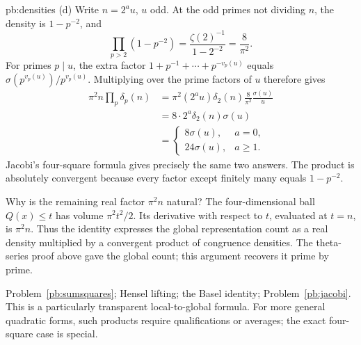 \begin{solution}{pb:densities}
(d) Write $n=2^au$, $u$ odd. At the odd primes not dividing $n$, the density is $1-p^{-2}$, and
\[
\prod_{p>2}(1-p^{-2})
=\frac{\zeta(2)^{-1}}{1-2^{-2}}
=\frac8{\pi^2}.
\]
For primes $p\mid u$, the extra factor
$1+p^{-1}+\cdots+p^{-v_p(u)}$ equals
$\sigma(p^{v_p(u)})/p^{v_p(u)}$. Multiplying over the prime factors of $u$ therefore gives
\[
\begin{aligned}
\pi^2 n\prod_p\delta_p(n)
&=\pi^2(2^au)\delta_2(n)
   \frac8{\pi^2}\frac{\sigma(u)}u\\
&=8\cdot2^a\delta_2(n)\sigma(u)\\
&=\begin{cases}
8\sigma(u),&a=0,\\
24\sigma(u),&a\ge1.
\end{cases}
\end{aligned}
\]
Jacobi's four-square formula gives precisely the same two answers. The product is absolutely convergent because every factor except finitely many equals $1-p^{-2}$.

Why is the remaining real factor $\pi^2n$ natural? The four-dimensional ball $Q(x)\le t$ has volume $\pi^2t^2/2$. Its derivative with respect to $t$, evaluated at $t=n$, is $\pi^2n$. Thus the identity expresses the global representation count as a real density multiplied by a convergent product of congruence densities. The theta-series proof above gave the global count; this argument recovers it prime by prime.

\tools Problem~\ref{pb:sumsquares}; Hensel lifting; the Basel identity; Problem~\ref{pb:jacobi}.
\leads This is a particularly transparent local-to-global formula. For more general quadratic forms, such products require qualifications or averages; the exact four-square case is special.
\end{solution}

